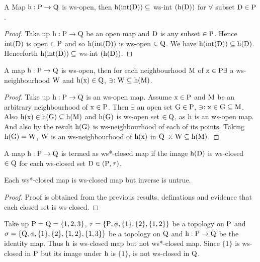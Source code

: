 \begin{thm}\label{thm4.2.40}
A Map $\mathrm{h}: \mathrm{P}\to\mathrm{Q}$ is ws-open, then $\mathrm{h} (\text{int}(\mathrm{D})) \subseteq$ ws-int $(\mathrm{h}(\mathrm{D}))$ for $\forall$ subset $\mathrm{D}\in \mathrm{P}$.
\end{thm}

\begin{proof}
Take up $\mathrm{h}: \mathrm{P}\to \mathrm{Q}$ be an open map and $\mathrm{D}$ is any subset $\in\mathrm{P}$. Hence $\text{int}(\mathrm{D})$ is open $\in \mathrm{P}$ and so $\mathrm{h}(\text{int}(\mathrm{D}))$ is ws-open $\in\mathrm{Q}$. We have $\mathrm{h}(\text{int}(\mathrm{D})) \subseteq \mathrm{h}(\mathrm{D})$. Henceforth $\mathrm{h}(\text{int} (\mathrm{D})) \subseteq$ ws-int $(\mathrm{h}(\mathrm{D}))$.
\end{proof}

\begin{thm}\label{thm4.2.41}
A map $\mathrm{h}: \mathrm{P}\to \mathrm{Q}$ is ws-open, then for each neighbourhood $\mathrm{M}$ of $\mathrm{x} \in \mathrm{P} \exists$ a ws-neighbourhood $\mathrm{W}$ and $\mathrm{h}(\mathrm{x}) \in \mathrm{Q}$, $\ni:\mathrm{W} \subseteq \mathrm{h}(\mathrm{M})$.
\end{thm}

\begin{proof}
Take up $\mathrm{h}: \mathrm{P}\to \mathrm{Q}$ is an ws-open map. Assume $\mathrm{x}\in \mathrm{P}$ and $\mathrm{M}$ be an arbitrary neighbourhood of $\mathrm{x}\in \mathrm{P}$. Then $\exists$ an open set $\mathrm{G} \in \mathrm{P}$, $\ni: \mathrm{x} \in \mathrm{G} \subseteq \mathrm{M}$. Also $\mathrm{h}(\mathrm{x})\in \mathrm{h} (\mathrm{G}) \subseteq \mathrm{h} (\mathrm{M})$ and $\mathrm{h} (\mathrm{G})$ is ws-open set $\in \mathrm{Q}$, as $\mathrm{h}$ is an ws-open map. And also by the result $\mathrm{h} (\mathrm{G})$ is ws-neighbourhood of each of its points. Taking $\mathrm{h} (\mathrm{G}) = \mathrm{W}$, $\mathrm{W}$ is an ws-neighbourhood of $\mathrm{h}(\mathrm{x})$ in $\mathrm{Q} \ni: \mathrm{W} \subseteq \mathrm{h} (\mathrm{M})$.
\end{proof}

\begin{dfn}\label{defi4.2.42}
A map $\mathrm{h}: \mathrm{P}\to \mathrm{Q}$ is termed as ws*-closed map if the image $\mathrm{h}(\mathrm{D})$ is ws-closed $\in \mathrm{Q}$ for each ws-closed set $\mathrm{D} \in(\mathrm{P}, \tau)$.
\end{dfn}

\begin{thm}\label{thm4.2.43}
Each ws*-closed map is ws-closed map but inverse is untrue.
\end{thm}

\begin{proof}
Proof is obtained from the previous results, definations and evidence that each closed set is ws-closed.
\end{proof}

\begin{exm}\label{exam4.2.44}
Take up $\mathrm{P} = \mathrm{Q} = \{1, 2, 3\}$, $\tau = \{\mathrm{P}, \phi, \{1\}, \{2\}, \{1, 2\}\}$ be a topology on $\mathrm{P}$ and $\sigma = \{\mathrm{Q}, \phi, \{1\}, \{2\},\{1, 2\},\{1,3\}\}$ be a topology on $\mathrm{Q}$ and $\mathrm{h}: \mathrm{P} \to \mathrm{Q}$ be the identity map. Thus $\mathrm{h}$ is ws-closed map but not ws*-closed map. Since $\{1\}$ is ws-closed in $\mathrm{P}$ but its image under $\mathrm{h}$ is $\{1\}$, is not ws-closed in $\mathrm{Q}$.
\end{exm}

